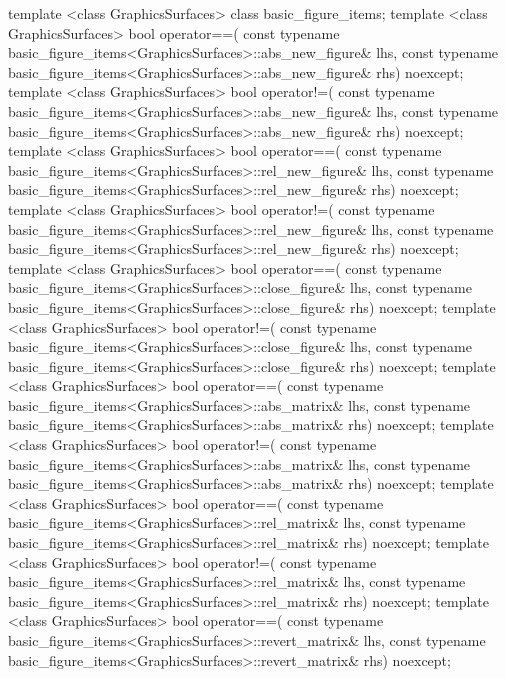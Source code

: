\begin{codeblock}
{{{{    template <class GraphicsSurfaces>
    class basic_figure_items;
    template <class GraphicsSurfaces>
    bool operator==(
      const typename basic_figure_items<GraphicsSurfaces>::abs_new_figure& lhs,
      const typename basic_figure_items<GraphicsSurfaces>::abs_new_figure& rhs) 
      noexcept;
    template <class GraphicsSurfaces>
    bool operator!=(
      const typename basic_figure_items<GraphicsSurfaces>::abs_new_figure& lhs,
      const typename basic_figure_items<GraphicsSurfaces>::abs_new_figure& rhs) noexcept;
    template <class GraphicsSurfaces>
    bool operator==(
      const typename basic_figure_items<GraphicsSurfaces>::rel_new_figure& lhs,
      const typename basic_figure_items<GraphicsSurfaces>::rel_new_figure& rhs) 
      noexcept;
    template <class GraphicsSurfaces>
    bool operator!=(
      const typename basic_figure_items<GraphicsSurfaces>::rel_new_figure& lhs,
      const typename basic_figure_items<GraphicsSurfaces>::rel_new_figure& rhs) 
      noexcept;
    template <class GraphicsSurfaces>
    bool operator==(
      const typename basic_figure_items<GraphicsSurfaces>::close_figure& lhs,
      const typename basic_figure_items<GraphicsSurfaces>::close_figure& rhs) 
      noexcept;
    template <class GraphicsSurfaces>
    bool operator!=(
      const typename basic_figure_items<GraphicsSurfaces>::close_figure& lhs,
      const typename basic_figure_items<GraphicsSurfaces>::close_figure& rhs) 
      noexcept;
    template <class GraphicsSurfaces>
    bool operator==(
      const typename basic_figure_items<GraphicsSurfaces>::abs_matrix& lhs,
      const typename basic_figure_items<GraphicsSurfaces>::abs_matrix& rhs) 
      noexcept;
    template <class GraphicsSurfaces>
    bool operator!=(
      const typename basic_figure_items<GraphicsSurfaces>::abs_matrix& lhs,
      const typename basic_figure_items<GraphicsSurfaces>::abs_matrix& rhs) 
      noexcept;
    template <class GraphicsSurfaces>
    bool operator==(
      const typename basic_figure_items<GraphicsSurfaces>::rel_matrix& lhs,
      const typename basic_figure_items<GraphicsSurfaces>::rel_matrix& rhs) 
      noexcept;
    template <class GraphicsSurfaces>
    bool operator!=(
      const typename basic_figure_items<GraphicsSurfaces>::rel_matrix& lhs,
      const typename basic_figure_items<GraphicsSurfaces>::rel_matrix& rhs) 
      noexcept;
    template <class GraphicsSurfaces>
    bool operator==(
      const typename basic_figure_items<GraphicsSurfaces>::revert_matrix& lhs,
      const typename basic_figure_items<GraphicsSurfaces>::revert_matrix& rhs) 
      noexcept;
}}}}
\end{codeblock}
